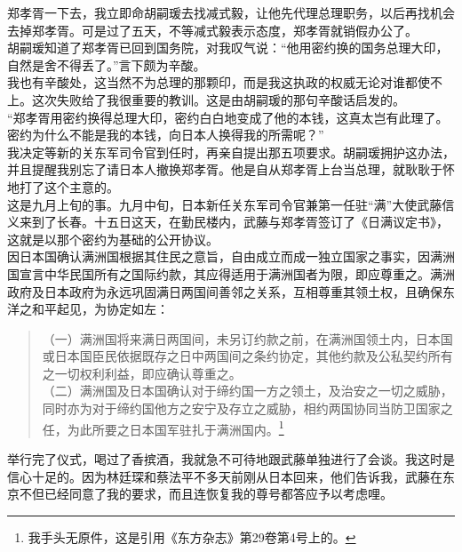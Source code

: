郑孝胥一下去，我立即命胡嗣瑗去找减式毅，让他先代理总理职务，以后再找机会去掉郑孝胥。可是过了五天，不等减式毅表示态度，郑孝胥就销假办公了。\\

胡嗣瑗知道了郑孝胥已回到国务院，对我叹气说：“他用密约换的国务总理大印，自然是舍不得丢了。”言下颇为辛酸。\\

我也有辛酸处，这当然不为总理的那颗印，而是我这执政的权威无论对谁都使不上。这次失败给了我很重要的教训。这是由胡嗣瑗的那句辛酸话启发的。\\

“郑孝胥用密约换得总理大印，密约白白地变成了他的本钱，这真太岂有此理了。密约为什么不能是我的本钱，向日本人换得我的所需呢？”\\

我决定等新的关东军司令官到任时，再亲自提出那五项要求。胡嗣瑗拥护这办法，并且提醒我别忘了请日本人撤换郑孝胥。他是自从郑孝胥上台当总理，就耿耿于怀地打了这个主意的。\\

这是九月上旬的事。九月中旬，日本新任关东军司令官兼第一任驻“满”大使武藤信义来到了长春。十五日这天，在勤民楼内，武藤与郑孝胥签订了《日满议定书》，这就是以那个密约为基础的公开协议。\\

因日本国确认满洲国根据其住民之意旨，自由成立而成一独立国家之事实，因满洲国宣言中华民国所有之国际约款，其应得适用于满洲国者为限，即应尊重之。满洲政府及日本政府为永远巩固满日两国间善邻之关系，互相尊重其领土权，且确保东洋之和平起见，为协定如左：\\

\begin{quote}
	（一）满洲国将来满日两国间，未另订约款之前，在满洲国领土内，日本国或日本国臣民依据既存之日中两国间之条约协定，其他约款及公私契约所有之一切权利利益，即应确认尊重之。\\

（二）满洲国及日本国确认对于缔约国一方之领土，及治安之一切之威胁，同时亦为对于缔约国他方之安宁及存立之威胁，相约两国协同当防卫国家之任，为此所要之日本国军驻扎于满洲国内。\footnote{我手头无原件，这是引用《东方杂志》第29卷第4号上的。}\\
\end{quote}

举行完了仪式，喝过了香摈酒，我就急不可待地跟武藤单独进行了会谈。我这时是信心十足的。因为林廷琛和蔡法平不多天前刚从日本回来，他们告诉我，武藤在东京不但已经同意了我的要求，而且连恢复我的尊号都答应予以考虑哩。\\

